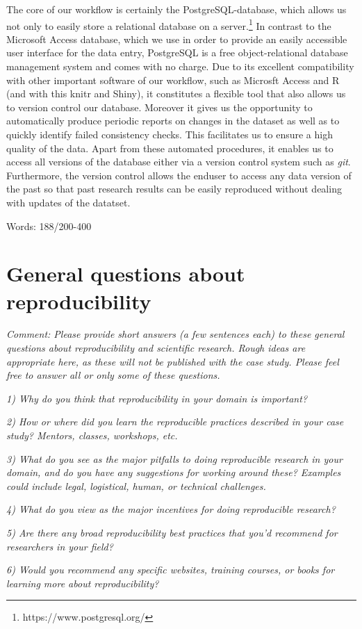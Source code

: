 \documentclass[
  11pt
]{article}
\begin{document}
\noindent
The core of our workflow is certainly the PostgreSQL-database, which allows us not only to easily store a relational database on a server.\footnote{https://www.postgresql.org/} In contrast to the Microsoft Access database, which we use in order to provide an easily accessible user interface for the data entry, PostgreSQL is a free object-relational database management system and comes with no charge. Due to its excellent compatibility with other important software of our workflow, such as Microsft Access and R (and with this knitr and Shiny), it constitutes a flexible tool that also allows us to version control our database. Moreover it gives us the opportunity to automatically produce periodic reports on changes in the dataset as well as to quickly identify failed consistency checks. This facilitates us to ensure a high  quality of the data. Apart from these automated procedures, it enables us to access all versions of the database either via a version control system such as \textit{git}. Furthermore, the version control allows the enduser to access any data version of the past so that past research results can be easily reproduced without dealing with updates of the datatset.

\vspace*{1cm}
\noindent
Words:  188/200-400

\section{General questions about reproducibility}

\textit{Comment: Please provide short answers (a few sentences each) to these general questions about reproducibility and scientific research. Rough ideas are appropriate here, as these will not be published with the case study. Please feel free to answer all or only some of these questions.}

\noindent
\textit{1) Why do you think that reproducibility in your domain is important?}

\noindent
\textit{2) How or where did you learn the reproducible practices described in your case study? Mentors, classes, workshops, etc.}

\noindent
\textit{3) What do you see as the major pitfalls to doing reproducible research in your domain, and do you have any suggestions for working around these? Examples could include legal, logistical, human, or technical challenges.}

\noindent
\textit{4) What do you view as the major incentives for doing reproducible research?}

\noindent
\textit{5) Are there any broad reproducibility best practices that you'd recommend for researchers in your field?}

\noindent
\textit{6) Would you recommend any specific websites, training courses, or books for learning more about reproducibility?}

\clearpage



\end{document}
